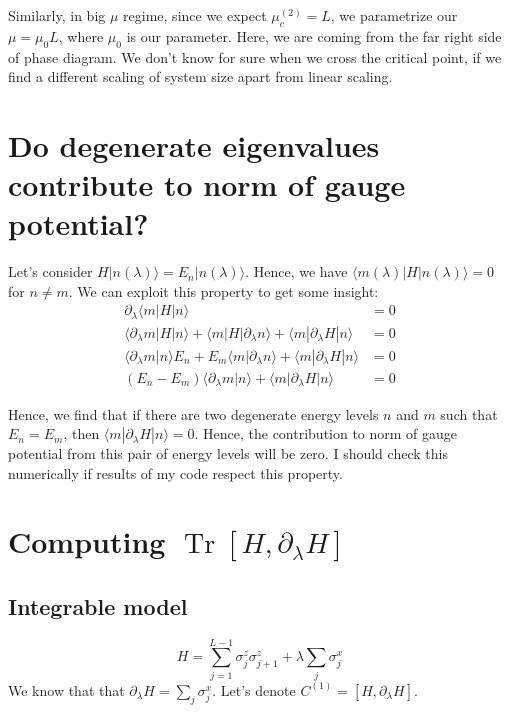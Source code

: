 \documentclass[11pt,a4paper]{article}
\DeclareMathOperator{\Tr}{Tr}
\begin{document}
Similarly, in big $\mu$ regime, since we expect $\mu_c^{(2)}= L$, we parametrize our $\mu= \mu_0 L$, where $\mu_0$ is our parameter. Here, we are coming from the far right side of phase diagram. We don't know for sure when we cross the critical point, if we find a different scaling of system size apart from linear scaling.
\newpage
\appendix
\section{Do degenerate eigenvalues contribute to norm of gauge potential?}\label{sec.deg}
Let's consider $H | n(\lambda) \rangle= E_n  | n(\lambda) \rangle $. Hence, we have $\langle m(\lambda)  |  H | n(\lambda) \rangle=0$ for $n\neq m$. We can exploit this property to get some insight:
\begin{align*}
\partial_{\lambda}\langle m  |  H | n\rangle&=0\\
\langle \partial_{\lambda} m |  H | n \rangle + \langle  m  |  H |\partial_{\lambda} n \rangle + \langle  m  | \partial_{\lambda} H | n \rangle&=0\\
\langle \partial_{\lambda} m   | n \rangle E_n + E_m\langle  m  |   \partial_{\lambda} n \rangle + \langle  m  | \partial_{\lambda} H | n \rangle&=0\\
(E_n - E_m)\langle  \partial_{\lambda} m  |    n \rangle + \langle  m  | \partial_{\lambda} H | n \rangle&=0
\end{align*}

Hence, we find that if there are two degenerate energy levels $n$ and $m$ such that $E_n=E_m$, then $\langle  m  | \partial_{\lambda} H | n \rangle=0$. Hence, the contribution to norm of gauge potential from this pair of energy levels will be zero. I should check this numerically if results of my code respect this property.


\section{Computing $\Tr [H, \partial_{\lambda}H] $}
\subsection{Integrable model}
\begin{equation}
H=  \sum_{j=1}^{L-1} \sigma_j^z \sigma_{j+1}^z + \lambda \sum_{j} \sigma_j^x
\end{equation}
We know that that $\partial_{\lambda}H =  \sum_{j} \sigma_j^x $. Let's denote  $C^{(1)}=[H,\partial_{\lambda}H]$. 
\end{document}
